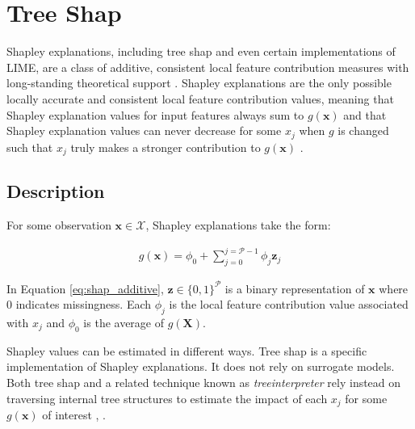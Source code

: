 \documentclass[11pt]{asaproc}
\begin{document}
\section{Tree Shap} \label{sec:shap}

Shapley explanations, including tree shap and even certain implementations of LIME, are a class of additive, consistent local feature contribution measures with long-standing theoretical support \cite{shapley}. Shapley explanations are the only possible locally accurate and consistent local feature contribution values, meaning that Shapley explanation values for input features always sum to $g(\mathbf{x})$ and that Shapley explanation values can never decrease for some $x_j$ when $g$ is changed such that $x_j$ truly makes a stronger contribution to $g(\mathbf{x})$ \cite{shapley}. 

\vspace{10pt}

\subsection{Description}

For some observation $\mathbf{x} \in \mathcal{X}$, Shapley explanations take the form:

\begin{equation}
\label{eq:shap_additive}
\begin{aligned}
g(\mathbf{x}) = \phi_0 + \sum_{j=0}^{j=\mathcal{P} - 1} \phi_j \mathbf{z}_j
\end{aligned}
\end{equation}

\noindent In Equation \ref{eq:shap_additive}, $\mathbf{z} \in \{0,1\}^\mathcal{P}$ is a binary representation of $\mathbf{x}$ where 0 indicates missingness. Each $\phi_j$ is the local feature contribution value associated with $x_j$ and $\phi_0$ is the average of $g(\mathbf{X})$. 

Shapley values can be estimated in different ways. Tree shap is a specific implementation of Shapley explanations. It does not rely on surrogate models. Both tree shap and a related technique known as \textit{treeinterpreter} rely instead on traversing internal tree structures to estimate the impact of each $x_j$ for some $g(\mathbf{x})$ of interest \cite{tree_shap}, \cite{treeinterpreter}.
\end{document}
